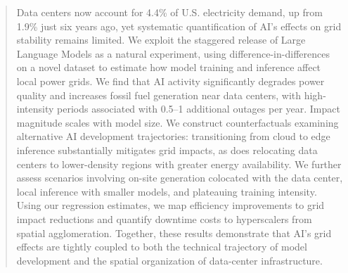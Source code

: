 \documentclass[sigconf]{acmart}
\begin{document}
\begin{abstract}

Data centers now account for 4.4\% of U.S. electricity demand, up from 1.9\% just six years ago, yet systematic quantification of AI's effects on grid stability remains limited. We exploit the staggered release of Large Language Models as a natural experiment, using difference-in-differences on a novel dataset to estimate how model training and inference affect local power grids. We find that AI activity significantly degrades power quality and increases fossil fuel generation near data centers, with high-intensity periods associated with 0.5–1 additional outages per year. Impact magnitude scales with model size.
We construct counterfactuals examining alternative AI development trajectories: transitioning from cloud to edge inference substantially mitigates grid impacts, as does relocating data centers to lower-density regions with greater energy availability. We further assess scenarios involving on-site generation colocated with the data center, local inference with smaller models, and plateauing training intensity. Using our regression estimates, we map efficiency improvements to grid impact reductions and quantify downtime costs to hyperscalers from spatial agglomeration. Together, these results demonstrate that AI's grid effects are tightly coupled to both the technical trajectory of model development and the spatial organization of data-center infrastructure.



\end{abstract}
\end{document}
